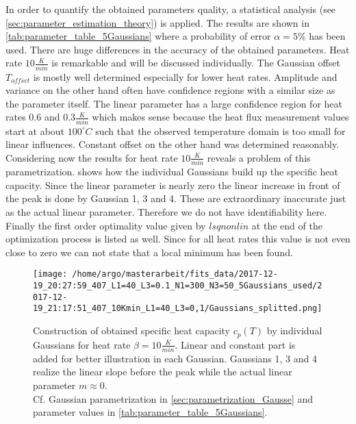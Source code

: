 \documentclass{scrartcl}[12pt, halfparskip]
\numberwithin{equation}{section}
\numberwithin{figure}{section}
\numberwithin{table}{section}
\begin{document}
In order to quantify the obtained parameters quality, a statistical analysis (see \cref{sec:parameter_estimation_theory}) is applied. The results are shown in \cref{tab:parameter_table_5Gaussians} where a probability of error $\alpha=5\%$ has been used. There are huge differences in the accuracy of the obtained parameters. Heat rate $10 \frac{K}{min}$ is remarkable and will be discussed individually. The Gaussian offset $T_{offset}$ is mostly well determined especially for lower heat rates. Amplitude and variance on the other hand often have confidence regions with a similar size as the parameter itself. The linear parameter has a large confidence region for heat rates $0.6$ and $0.3 \frac{K}{min}$ which makes sense because the heat flux measurement values start at about $100^{\circ}C$ such that the observed temperature domain is too small for linear influences. Constant offset on the other hand was determined reasonably. \\
Considering now the results for heat rate $10 \frac{K}{min}$ reveals a problem of this parametrization.  shows how the individual Gaussians build up the specific heat capacity. Since the linear parameter is nearly zero the linear increase in front of the peak is done by Gaussian 1, 3 and 4. These are extraordinary inaccurate just as the actual linear parameter. Therefore we do not have identifiability here. \\
Finally the first order optimality value given by $lsqnonlin$ at the end of the optimization process is listed as well. Since for all heat rates this value is not even close to zero we can not state that a local minimum has been found.


\begin{figure}[H]
	\centering
	\texttt{[image: /home/argo/masterarbeit/fits\_data/2017-12-19\_20:27:59\_407\_L1=40\_L3=0.1\_N1=300\_N3=50\_5Gaussians\_used/2017-12-19\_21:17:51\_407\_10Kmin\_L1=40\_L3=0,1/Gaussians\_splitted.png]}
	\caption{Construction of obtained specific heat capacity $c_p(T)$ by individual Gaussians for heat rate $\beta = 10 \frac{K}{min}$. Linear and constant part is added for better illustration in each Gaussian. Gaussians 1, 3 and 4 realize the linear slope before the peak while the actual linear parameter $m \approx 0$. \\
	Cf. Gaussian parametrization in \cref{sec:parametrization_Gausse} and parameter values in \cref{tab:parameter_table_5Gaussians}.}
	\label{fig:Gaussians_splitted_pathologic}
\end{figure}
\end{document}

